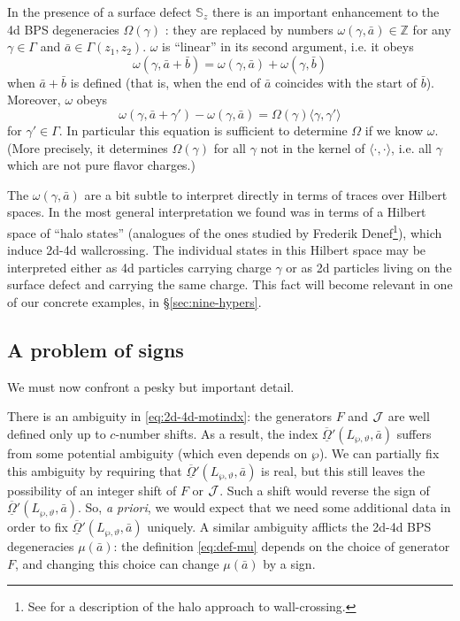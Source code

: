 \documentclass[11pt,a4paper]{article}
\def\Z{{\mathbb{Z}}}
\def\CJ {{\cal J}}
\newcommand{\ti}[1]{\textit{#1}}
\def\CJ {{\cal J}}
\newcommand{\inprod}[1]{\langle#1\rangle}
\newcommand\fro{{\overline{\underline{\Omega}}}}
\newcommand{\bS}{\mathbb S}
\begin{document}
In the presence of a surface defect $\bS_z$ there is an important enhancement to the 4d BPS degeneracies $\Omega(\gamma)$ \cite{Gaiotto:2011tf}:  they are replaced by numbers
$\omega(\gamma, \bar a) \in \Z$ for any $\gamma \in \Gamma$
and $\bar a \in \Gamma(z_1,z_2)$.  $\omega$ is ``linear'' in its second argument, i.e. it obeys
\begin{equation}
 \omega(\gamma, \bar a + \bar b) = \omega(\gamma, \bar a) + \omega(\gamma, \bar b)
\end{equation}
when $\bar a+\bar b$ is defined (that is, when the end of $\bar a$ coincides with the
start of $\bar b$).  Moreover, $\omega$ obeys
\begin{equation} \label{eq:Omega-def}
\omega(\gamma, \bar a + \gamma') - \omega(\gamma, \bar a) = \Omega(\gamma) \inprod{\gamma, \gamma'}
\end{equation}
for $\gamma' \in \Gamma$.
In particular this equation is sufficient to determine $\Omega$ if we know $\omega$.
(More precisely, it determines $\Omega(\gamma)$ for all $\gamma$ not in the kernel
of $\inprod{\cdot, \cdot}$, i.e. all $\gamma$ which are not pure flavor charges.)

The $\omega(\gamma, \bar a)$ are a bit subtle to interpret directly in terms of
traces over Hilbert spaces.  In \cite{Gaiotto:2011tf} the most general interpretation we found
was in terms of a Hilbert space of ``halo states'' (analogues of the ones studied by Frederik
Denef\footnote{See \cite{Denef:2007vg,Gaiotto:2010be,Andriyash:2010yf,Andriyash:2010qv}
for a description of the halo approach to wall-crossing.}), which induce 2d-4d wallcrossing.
The individual states in this Hilbert space may be interpreted either as 4d particles carrying
charge $\gamma$ or as 2d particles living on the surface defect and
carrying the same charge.
This fact will become relevant in one of our concrete examples,
in \S\ref{sec:nine-hypers}.


\subsection{A problem of signs} \label{sec:tricky-sign}

We must now confront a pesky but important detail.

There is an ambiguity in \eqref{eq:2d-4d-motindx}:  the generators $F$ and $\CJ$
are well defined only up to $c$-number shifts.  As a result, the index $\fro'(L_{\wp,\vartheta}, \bar a)$
suffers from some potential ambiguity (which even depends on $\wp$).  We can partially fix this ambiguity by requiring that
$\fro'(L_{\wp,\vartheta}, \bar a)$ is real, but this still leaves the possibility of an integer shift
of $F$ or $\CJ$.  Such a shift would reverse the sign of $\fro'(L_{\wp,\vartheta}, \bar a)$.
So, \ti{a priori}, we would expect that we need some additional data in order
to fix $\fro'(L_{\wp,\vartheta}, \bar a)$ uniquely.
A similar ambiguity afflicts the 2d-4d BPS degeneracies $\mu(\bar a)$:  the definition \eqref{eq:def-mu}
depends on the choice of generator $F$, and changing this choice can change $\mu(\bar a)$ by a sign.
\end{document}
